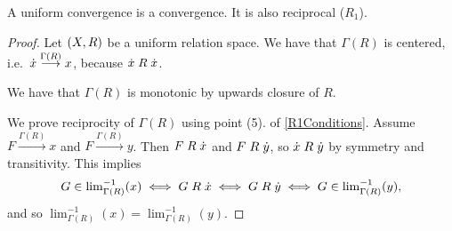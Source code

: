 \begin{lemma} \label{associatedUniformConvergence}
A uniform convergence is a convergence. It is also reciprocal ($R_1$).
\end{lemma}
\begin{proof}
Let $\left( X,R \right)$ be a uniform relation space. We have that $\Gamma(R)$ is centered, i.e.\ $\dot{x} \overset{\Gamma(R)}{\longrightarrow} x$, because $\dot{x}\mathrel{R}\dot{x}$.

We have that $\Gamma(R)$ is monotonic by upwards closure of $R$.

We prove reciprocity of $\Gamma(R)$ using point (5). of \ref{R1Conditions}. Assume $F \overset{\Gamma(R)}{\longrightarrow} x$ and $F \overset{\Gamma(R)}{\longrightarrow} y$. Then $F\mathrel{R}\dot{x}$ and $F\mathrel{R}\dot{y}$, so $\dot{x}\mathrel{R}\dot{y}$ by symmetry and transitivity. This implies
\[ G \in {\lim}_{\Gamma(R)}^{-1}(x) \iff G\mathrel{R}\dot{x}\iff G\mathrel{R}\dot{y} \iff G\in {\lim}_{\Gamma(R)}^{-1}(y), \]
and so $\lim_{\Gamma(R)}^{-1}(x) = \lim_{\Gamma(R)}^{-1}(y)$.
\end{proof}

